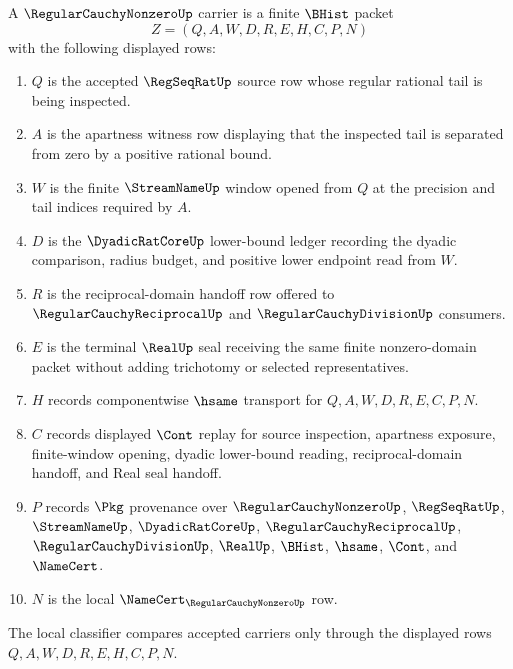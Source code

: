 \begin{definition}
\label{def:regular-cauchy-nonzero-carrier}
A $\RegularCauchyNonzeroUp$ carrier is a finite $\BHist$ packet
$$
Z=(Q,A,W,D,R,E,H,C,P,N)
$$
with the following displayed rows:
\begin{enumerate}
\item $Q$ is the accepted $\RegSeqRatUp$ source row whose regular rational tail is being inspected.
\item $A$ is the apartness witness row displaying that the inspected tail is separated from zero by a positive rational bound.
\item $W$ is the finite $\StreamNameUp$ window opened from $Q$ at the precision and tail indices required by $A$.
\item $D$ is the $\DyadicRatCoreUp$ lower-bound ledger recording the dyadic comparison, radius budget, and positive lower endpoint read from $W$.
\item $R$ is the reciprocal-domain handoff row offered to $\RegularCauchyReciprocalUp$ and $\RegularCauchyDivisionUp$ consumers.
\item $E$ is the terminal $\RealUp$ seal receiving the same finite nonzero-domain packet without adding trichotomy or selected representatives.
\item $H$ records componentwise $\hsame$ transport for $Q,A,W,D,R,E,C,P,N$.
\item $C$ records displayed $\Cont$ replay for source inspection, apartness exposure, finite-window opening, dyadic lower-bound reading, reciprocal-domain handoff, and Real seal handoff.
\item $P$ records $\Pkg$ provenance over $\RegularCauchyNonzeroUp$, $\RegSeqRatUp$, $\StreamNameUp$, $\DyadicRatCoreUp$, $\RegularCauchyReciprocalUp$, $\RegularCauchyDivisionUp$, $\RealUp$, $\BHist$, $\hsame$, $\Cont$, and $\NameCert$.
\item $N$ is the local $\NameCert_{\RegularCauchyNonzeroUp}$ row.
\end{enumerate}
The local classifier compares accepted carriers only through the displayed rows $Q,A,W,D,R,E,H,C,P,N$.
\end{definition}

